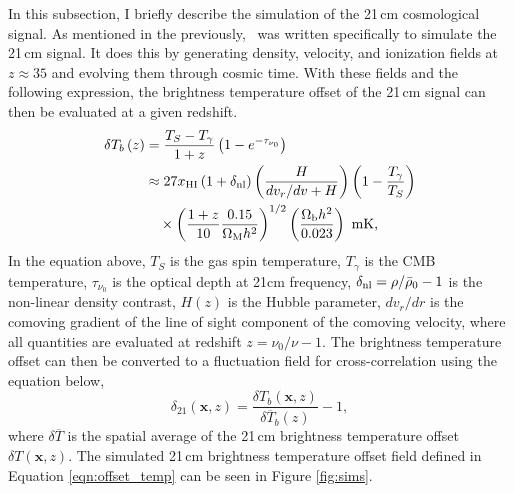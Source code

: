 \label{sec:21cm_temp}

In this subsection, I briefly describe the simulation of the 21\,cm cosmological
signal. As mentioned in the previously, \fastsim\ was written specifically to simulate the 21\,cm
signal. It does this by generating density, velocity, and ionization fields at $z \approx 35$ and evolving
them through cosmic time. With these fields and the following expression, the brightness temperature offset of the
21\,cm signal can then be evaluated at a given redshift.
\begin{align}
  \delta T_b \left(z \right) & = \frac{T_S - T_{\gamma}}{1+z} \left(1 - e^{-\tau_{\nu_0}} \right ) \nonumber \\
      & \approx 27 x_{\rm HI} \left( 1 + \delta_{\rm nl} \right) \left( \frac{H}{dv_r/dv + H}\right) \left( 1 - \frac{T_{\gamma}}{T_S}\right) \nonumber \\
      & \hspace{1em} \times \left( \frac{1 + z}{10} \frac{0.15}{\Omega_{\rm M} h^2} \right)^{1/2} \left( \frac{\Omega_{\rm b} h^2}{0.023} \right) \textrm{ mK,}
      \label{eqn:offset_temp}
\end{align}
In the equation above, $T_S$ is the gas spin temperature, $T_{\gamma}$ is the
CMB temperature, $\tau_{\nu_0}$ is the optical depth at 21cm frequency, $\delta_{\rm nl} = \rho / \bar{\rho}_0 - 1$
is the non-linear density contrast, $H \left( z \right)$
is the Hubble parameter, $dv_r / dr$ is the comoving gradient of the line of sight component
of the comoving velocity, where all quantities are evaluated at redshift $z = \nu_0 / \nu - 1$.
The brightness temperature offset can then be converted to a fluctuation field
for cross-correlation using the equation below,
\begin{equation}
\delta_{21} \left( \mathbf{x}, z\right) = \frac{ \delta T_b \left( \mathbf{x}, z\right)}{\delta \overline{T}_b \left( z \right)} - 1,
\end{equation}
where $\delta \overline{T}$ is the spatial average of the 21\,cm brightness temperature offset
$\delta T \left( \mathbf{x}, z\right)$. The simulated 21\,cm brightness temperature offset field defined
in Equation \ref{eqn:offset_temp} can be seen in Figure \ref{fig:sims}.
